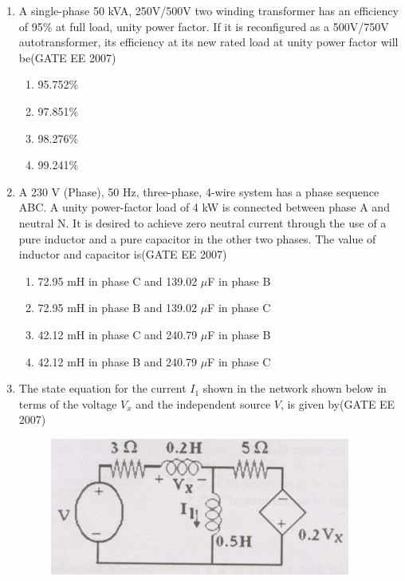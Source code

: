 \documentclass[a4paper,10pt]{exam}
\theoremstyle{remark}
\begin{document}
\begin{enumerate}
\vfill
{}
\newpage

\item \quad A single-phase 50 kVA, 250V/500V two winding transformer has an efficiency of 95\% at full load, unity power factor. If it is reconfigured as a 500V/750V autotransformer, its efficiency at its new rated load at unity power factor will be\hfill{(GATE EE 2007)} 

\begin{multicols}{4}
\begin{enumerate}
     \item 95.752\%
\item 97.851\%
\item 98.276\%
\item 99.241\%
\end{enumerate}
\end{multicols}

\item \quad A 230 V (Phase), 50 Hz, three-phase, 4-wire system has a phase sequence ABC. A unity power-factor load of 4 kW is connected between phase A and neutral N. It is desired to achieve zero neutral current through the use of a pure inductor and a pure capacitor in the other two phases. The value of inductor and capacitor is\hfill{(GATE EE 2007)} 

\begin{enumerate}
    \item 72.95 mH in phase C and 139.02 $\mu$F in phase B
    \item 72.95 mH in phase B and 139.02 $\mu$F in phase C
    \item 42.12 mH in phase C and 240.79 $\mu$F in phase B
    \item 42.12 mH in phase B and 240.79 $\mu$F in phase C
\end{enumerate}

\item \quad The state equation for the current $I_1$ shown in the network shown below in terms of the voltage $V_x$ and the independent source $V$, is given by\hfill{(GATE EE 2007)} 

\begin{figure}[H]
    \centering
    \includegraphics[width=0.45\linewidth]{figs/Q 50 2007.png}
\end{figure}


\end{enumerate}
\end{document}
